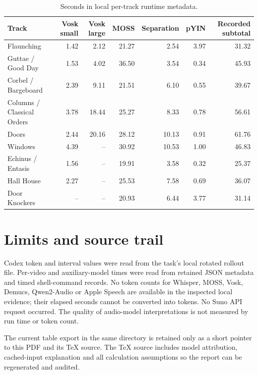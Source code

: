 \documentclass[10pt]{article}
\begin{document}
\begin{table}[H]
\centering\small
\caption{Seconds in local per-track runtime metadata.}
\begin{tabularx}{\linewidth}{Xrrrrrr}
\toprule\textbf{Track} & \textbf{Vosk small} & \textbf{Vosk large} & \textbf{MOSS} & \textbf{Separation} & \textbf{pYIN} & \textbf{Recorded subtotal}\\\midrule
Flaunching & 1.42 & 2.12 & 21.27 & 2.54 & 3.97 & 31.32\\
Guttae / Good Day & 1.53 & 4.02 & 36.50 & 3.54 & 0.34 & 45.93\\
Corbel / Bargeboard & 2.39 & 9.11 & 21.51 & 6.10 & 0.55 & 39.67\\
Columns / Classical Orders & 3.78 & 18.44 & 25.27 & 8.33 & 0.78 & 56.61\\
Doors & 2.44 & 20.16 & 28.12 & 10.13 & 0.91 & 61.76\\
Windows & 4.39 & -- & 30.92 & 10.53 & 1.00 & 46.83\\
Echinus / Entasis & 1.56 & -- & 19.91 & 3.58 & 0.32 & 25.37\\
Hall House & 2.27 & -- & 25.53 & 7.58 & 0.69 & 36.07\\
Door Knockers & -- & -- & 20.93 & 6.44 & 3.77 & 31.14\\
\bottomrule
\end{tabularx}
\end{table}

\section{Limits and source trail}
Codex token and interval values were read from the task's local rotated rollout file. Per-video and auxiliary-model times were read from retained JSON metadata and timed shell-command records. No token counts for Whisper, MOSS, Vosk, Demucs, Qwen2-Audio or Apple Speech are available in the inspected local evidence; their elapsed seconds cannot be converted into tokens. No Suno API request occurred. The quality of audio-model interpretations is not measured by run time or token count.

The current table export in the same directory is retained only as a short pointer to this PDF and its TeX source. The TeX source includes model attribution, cached-input explanation and all calculation assumptions so the report can be regenerated and audited.
\end{document}
